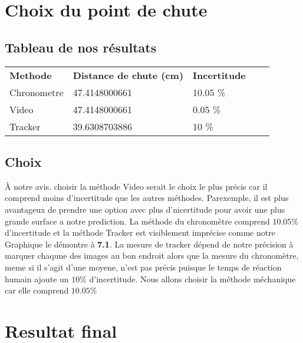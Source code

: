 \documentclass{article}
\begin{document}
        \section{Choix du point de chute}
            \vspace{5mm}
            \subsection{Tableau de nos résultats}
                 \begin{table}[H]
                \begin{tabular}{lllll}
                \textbf{Methode}     & \textbf{Distance de chute (cm)} & \textbf{Incertitude} &  &  \\
                Chronometre & 47.4148000661             & 10.05 \%    &  &  \\
                Video       & 47.4148000661             & 0.05 \%        &  &  \\
                Tracker     & 39.6308703886             & 10 \%       &  &
                \end{tabular}
                \end{table}
                \vspace{10mm}
            \subsection{Choix}
                \hspace{11mm} À notre avis. choisir la méthode Video serait le choix le plus précis car il comprend moins d'incertitude que les autres méthodes. Parexemple, il est plus avantageux de prendre une option avec plus d'nicertitude pour avoir une plus grande surface a notre prediction. La méthode du chronomètre comprend $10.05 \%$ d'incertitude et la méthode Tracker est visiblement imprécise comme notre Graphique le démontre à \textbf{7.1}. La mesure de tracker dépend de notre précision à marquer chaqune des images au bon endroit alors que la mesure du chronomètre, meme si il s'agit d'une moyene, n'est pas précis puisque le temps de réaction humain ajoute un $10 \%$ d'incertitude. Nous allons choisir la méthode méchanique car elle comprend $10.05 \%$
                \vspace{3mm}

        \section{Resultat final}
\end{document}
